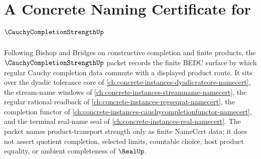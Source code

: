 \chapter{A Concrete Naming Certificate for $\CauchyCompletionStrengthUp$}
\label{ch:concrete-instances-cauchy-completion-strength-namecert}

Following Bishop and Bridges on constructive completion and finite products, the $\CauchyCompletionStrengthUp$ packet records the finite BEDC surface by which regular Cauchy completion data commute with a displayed product route. It sits over the dyadic tolerance core of \autoref{ch:concrete-instances-dyadicratcore-namecert}, the stream-name windows of \autoref{ch:concrete-instances-streamname-namecert}, the regular rational readback of \autoref{ch:concrete-instances-regseqrat-namecert}, the completion functor of \autoref{ch:concrete-instances-cauchycompletionfunctor-namecert}, and the terminal real-name seal of \autoref{ch:concrete-instances-real-namecert}. The packet names product-transport strength only as finite NameCert data; it does not assert quotient completion, selected limits, countable choice, host product equality, or ambient completeness of $\RealUp$.

